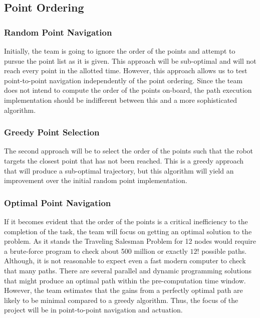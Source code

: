 \documentclass[12pt,conference,onecolumn]{article} %
\begin{document}
\subsection*{Point Ordering}
\subsubsection*{Random Point Navigation}
Initially, the team is going to ignore the order of the points and attempt to pursue the point list as it is given. This approach will be sub-optimal and will not reach every point in the allotted time. However, this approach allows us to test point-to-point navigation independently of the point ordering. Since the team does not intend to compute the order of the points on-board, the path execution implementation should be indifferent between this and a more sophisticated algorithm.
\subsubsection*{Greedy Point Selection}
The second approach will be to select the order of the points such that the robot targets the closest point that has not been reached. This is a greedy approach that will produce a sub-optimal trajectory, but this algorithm will yield an improvement over the initial random point implementation.
\subsubsection*{Optimal Point Navigation}
If it becomes evident that the order of the points is a critical inefficiency to the completion of the task, the team will focus on getting an optimal solution to the problem. As it stands the Traveling Salesman Problem for 12 nodes would require a brute-force program to check about 500 million or exactly $12!$ possible paths. Although, it is not reasonable to expect even a fast modern computer to check that many paths. There are several parallel and dynamic programming solutions that might produce an optimal path within the pre-computation time window. However, the team estimates that the gains from a perfectly optimal path are likely to be minimal compared to a greedy algorithm. Thus, the focus of the project will be in point-to-point navigation and actuation.
\end{document}
